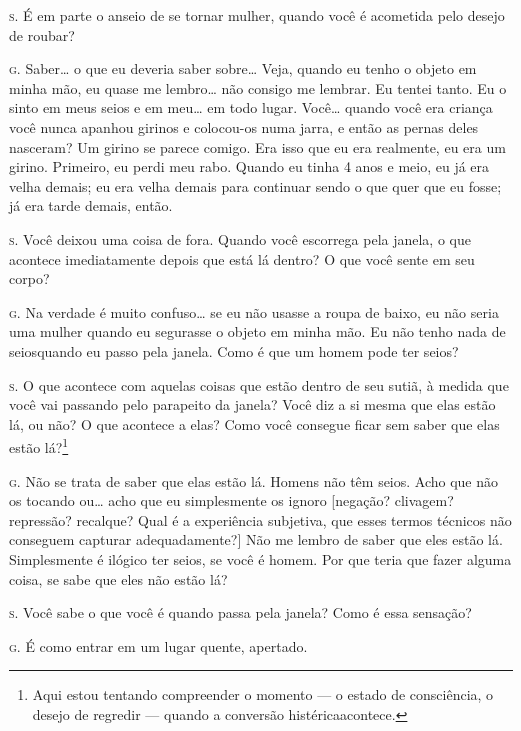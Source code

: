 \noindent\hskip0mm\textsc{s.} É em parte o anseio de se tornar mulher, quando você é acometida
pelo desejo de roubar?

\noindent\hskip0mm\textsc{g.} Saber\ldots{} o que eu deveria saber sobre\ldots{} Veja, quando eu tenho o
objeto em minha mão, eu quase me lembro\ldots{} não consigo me lembrar. Eu
tentei tanto. Eu o sinto em meus seios e em meu\ldots{} em todo lugar.
Você\ldots{} quando você era criança você nunca apanhou girinos e colocou-os
numa jarra, e então as pernas deles nasceram?\idxidenhis{} Um girino se parece
comigo. Era isso que eu era realmente, eu era um girino. Primeiro, eu
perdi meu rabo. Quando eu tinha 4 anos e meio, eu já era velha demais;
eu era velha demais para continuar sendo o que quer que eu fosse; já
era tarde demais, então.

\noindent\hskip0mm\textsc{s.} Você deixou uma coisa de fora. Quando você escorrega pela janela, o
que acontece imediatamente depois que está lá dentro? O que você sente
em seu corpo?

\noindent\hskip0mm\textsc{g.} Na verdade é muito confuso\ldots{} se eu não usasse a roupa de baixo, eu
não seria uma mulher quando eu segurasse o objeto em minha mão. Eu não
tenho nada de seios\idxseios[|(] quando eu passo pela janela. Como é que um homem
pode ter seios?

\noindent\hskip0mm\textsc{s.} O que acontece com aquelas coisas que estão dentro de seu sutiã, à
medida que você vai passando pelo parapeito da janela? Você diz a si
mesma que elas estão lá, ou não? O que acontece a elas? Como você
consegue ficar sem saber que elas estão lá?\footnote{ Aqui estou
tentando compreender o momento --- o estado de consciência, o desejo
de regredir --- quando a conversão histérica\idxidenhis[|nn] acontece.}

\noindent\hskip0mm\textsc{g.} Não se trata de saber que elas estão lá. Homens não têm seios. Acho
que não os tocando ou\ldots{} acho que eu simplesmente os ignoro [negação?
clivagem? repressão? recalque? Qual é a experiência subjetiva, que
esses termos técnicos não conseguem capturar adequadamente?] Não me
lembro de saber que eles estão lá. Simplesmente é ilógico ter seios, se
você é homem. Por que teria que fazer alguma coisa, se sabe que eles
não estão lá?

\noindent\hskip0mm\textsc{s.} Você sabe o que você é quando passa pela janela? Como é essa
sensação?

\noindent\hskip0mm\textsc{g.} É como entrar em um lugar quente, apertado.

